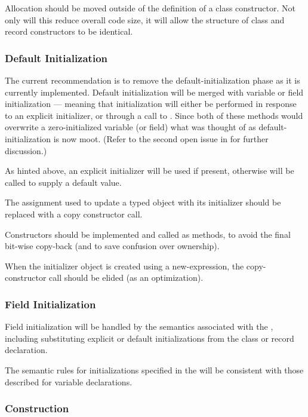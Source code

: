 Allocation should be moved outside of the definition of a class constructor.  Not only
will this reduce overall code size, it will allow the structure of class and record
constructors to be identical.

\subsubsection{Default Initialization}

The current recommendation is to remove the default-initialization phase as it is
currently implemented.  Default initialization will be merged with variable or field
initialization --- meaning that initialization will either be performed in response to
an explicit initializer, or through a call to .  Since both of these
methods would overwrite a zero-initialized variable (or field) what was thought of as
default-initialization is now moot.  (Refer to the second open issue in
 for further discussion.)

As hinted above, an explicit initializer will be used if present, otherwise
 will be called to supply a default value.

The assignment used to update a typed object with its initializer should be replaced with
a copy constructor call.

Constructors should be implemented and called as methods, to avoid the final bit-wise
copy-back (and to save confusion over ownership).

When the initializer object is created using a new-expression, the copy-constructor call
should be elided (as an optimization).

\subsubsection{Field Initialization}

Field initialization will be handled by the semantics associated with the
, including substituting explicit or default initializations from
the class or record declaration.

The semantic rules for initializations specified in the  will be
consistent with those described for variable declarations.

\subsubsection{Construction}

